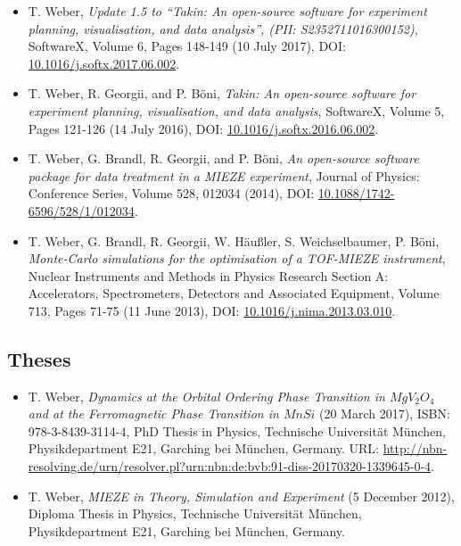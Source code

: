 \begin{itemize}
	\item T. Weber, \textit{Update 1.5 to ``Takin: An open-source software for experiment planning, visualisation, and data analysis'', (PII: S2352711016300152)},
	SoftwareX, Volume 6, Pages 148-149 (10 July 2017),
	DOI: \href{https://doi.org/10.1016/j.softx.2017.06.002}{10.1016/j.softx.2017.06.002}.

	\item T. Weber, R. Georgii, and P. B\"oni,
	\textit{Takin: An open-source software for experiment planning, visualisation, and data analysis},
	SoftwareX, Volume 5, Pages 121-126 (14 July 2016),
	DOI: \href{https://doi.org/10.1016/j.softx.2016.06.002}{10.1016/j.softx.2016.06.002}.

	\item T. Weber, G. Brandl, R. Georgii, and P. B\"oni,
	\textit{An open-source software package for data treatment in a MIEZE experiment},
	Journal of Physics: Conference Series, Volume 528, 012034 (2014),
	DOI: \href{https://doi.org/10.1088/1742-6596/528/1/012034}{10.1088/1742-6596/528/1/012034}.
	
	\item T. Weber, G. Brandl, R. Georgii, W. H\"au\ss{}ler, S. Weichselbaumer, P. B\"oni,
	\textit{Monte-Carlo simulations for the optimisation of a TOF-MIEZE instrument},
	Nuclear Instruments and Methods in Physics Research Section A: Accelerators, Spectrometers, Detectors and Associated Equipment, Volume 713, Pages 71-75 (11 June 2013),
	DOI: \href{https://doi.org/10.1016/j.nima.2013.03.010}{10.1016/j.nima.2013.03.010}.
\end{itemize}


\subsection*{Theses}
\begin{itemize}
	\item T. Weber, \textit{Dynamics at the Orbital Ordering Phase Transition in $MgV_2O_4$ and at the Ferromagnetic Phase Transition in $MnSi$} (20 March 2017), ISBN: 978-3-8439-3114-4,
	PhD Thesis in Physics, Technische Universit\"at M\"unchen, Physikdepartment E21,
	Garching bei M\"unchen, Germany. URL: \url{http://nbn-resolving.de/urn/resolver.pl?urn:nbn:de:bvb:91-diss-20170320-1339645-0-4}.

	\item T. Weber, \textit{MIEZE in Theory, Simulation and Experiment} (5 December 2012), 
	Diploma Thesis in Physics, Technische Universit\"at M\"unchen, Physikdepartment E21,
	Garching bei M\"unchen, Germany.
\end{itemize}



